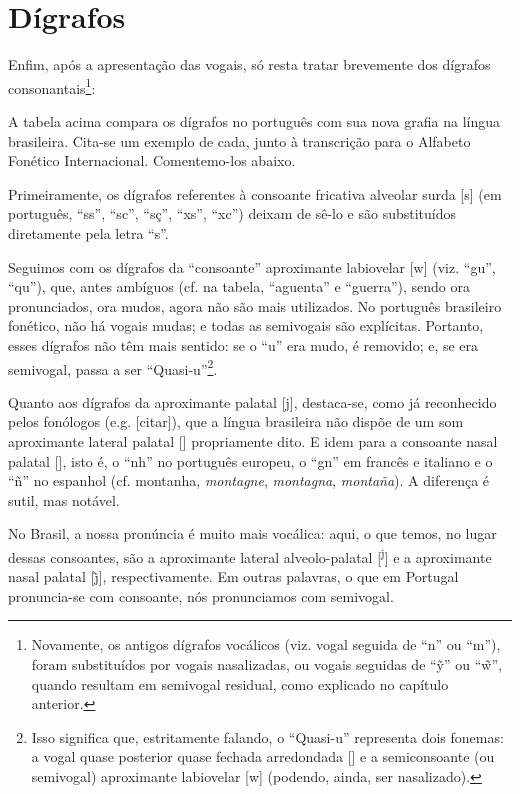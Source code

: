 \documentclass[12pt, a5paper, titlepage]{article}
\begin{document}
\section{Dígrafos}\label{pt.section.digraphs}
Enfim, após a apresentação das vogais, só resta tratar brevemente dos dígrafos consonantais\footnote{
    Novamente, os antigos dígrafos vocálicos (viz. vogal seguida de ``n'' ou ``m''), foram substituídos por vogais nasalizadas, ou vogais seguidas de ``\~y'' ou ``\~w'', quando resultam em semivogal residual, como explicado no capítulo anterior.
}:

\PtTableDigraphs

A tabela acima compara os dígrafos no português com sua nova grafia na língua brasileira. Cita-se um exemplo de cada, junto à transcrição para o Alfabeto Fonético Internacional. Comentemo-los abaixo.

Primeiramente, os dígrafos referentes à consoante fricativa alveolar surda [s] (em português, ``ss'', ``sc'', ``sç'', ``xs'', ``xc'') deixam de sê-lo e são substituídos diretamente pela letra ``s''.

Seguimos com os dígrafos da ``consoante'' aproximante labiovelar [w] (viz. ``gu'', ``qu''), que, antes ambíguos (cf. na tabela,   ``aguenta'' e ``guerra''), sendo ora pronunciados, ora mudos, agora não são mais utilizados. No português brasileiro fonético, não há vogais mudas; e todas as semivogais são explícitas. Portanto, esses dígrafos não têm mais sentido: se o ``u'' era mudo, é removido; e, se era semivogal, passa a ser ``Quasi-u''\footnote{
    Isso significa que, estritamente falando, o ``Quasi-u'' representa dois fonemas: a vogal quase posterior quase fechada arredondada [] e
    a semiconsoante (ou semivogal) aproximante labiovelar [w] (podendo, ainda, ser nasalizado).
}.

Quanto aos dígrafos da aproximante palatal [j], destaca-se, como já reconhecido pelos fonólogos (e.g. [citar]), que a língua brasileira não dispõe de um som aproximante lateral palatal [\textturny] propriamente dito. E idem para a consoante nasal palatal [\textltailn], isto é, o ``nh'' no português europeu, o ``gn'' em francês e italiano e o ``ñ'' no espanhol (cf.
montanha, \textit{montagne}, \textit{montagna}, \textit{montaña}). A diferença é sutil, mas notável.

No Brasil, a nossa pronúncia é muito mais vocálica: aqui, o que temos, no lugar dessas consoantes, são a aproximante lateral alveolo-palatal [\textsuperscript{j}] e a aproximante nasal palatal [\~\j], respectivamente. Em outras palavras, o que em Portugal pronuncia-se com consoante, nós pronunciamos com semivogal.
\end{document}

